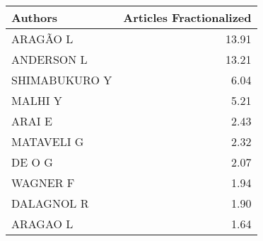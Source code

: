 
\begin{tabular}{lr}
\toprule
Authors & Articles Fractionalized\\
\midrule
ARAGÃO L & 13.91\\
ANDERSON L & 13.21\\
SHIMABUKURO Y & 6.04\\
MALHI Y & 5.21\\
ARAI E & 2.43\\
\addlinespace
MATAVELI G & 2.32\\
DE O G & 2.07\\
WAGNER F & 1.94\\
DALAGNOL R & 1.90\\
ARAGAO L & 1.64\\
\bottomrule
\end{tabular}